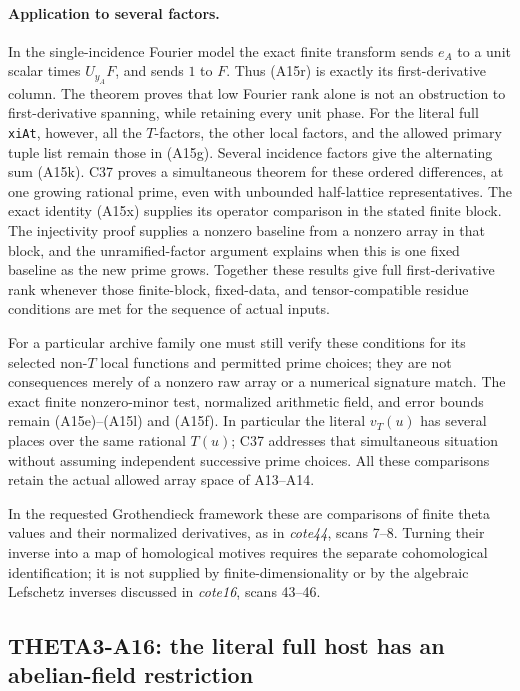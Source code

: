 \documentclass[11pt]{article}
\theoremstyle{definition}\newtheorem{definition}[theorem]{Definition}\newtheorem{remark}[theorem]{Remark}
\begin{document}
\paragraph{Application to several factors.}
In the single-incidence Fourier model the exact finite transform
sends $e_A$ to a unit scalar times $U_{y_A}F$, and sends $1$ to
$F$.  Thus (A15r) is exactly its first-derivative column.  The
theorem proves that low Fourier rank alone is not an obstruction
to first-derivative spanning, while retaining every unit phase.
For the literal full \texttt{xiAt}, however, all the $T$-factors,
the other local factors, and the allowed primary tuple list remain
those in (A15g).  Several incidence factors give the alternating
sum (A15k).  C37 proves a simultaneous theorem for these ordered
differences, at one growing rational prime, even with unbounded
half-lattice representatives.  The exact identity (A15x) supplies
its operator comparison in the stated finite block.  The
injectivity proof supplies a nonzero baseline from a nonzero
array in that block, and the unramified-factor argument explains
when this is one fixed baseline as the new prime grows.
Together these results give full first-derivative rank whenever
those finite-block, fixed-data, and tensor-compatible residue
conditions are met for the sequence of actual inputs.

For a particular archive family one must still verify these
conditions for its selected non-$T$ local functions and permitted
prime choices; they are not consequences merely of a nonzero raw
array or a numerical signature match.  The exact finite
nonzero-minor test, normalized arithmetic field, and error bounds
remain (A15e)--(A15l) and (A15f).  In particular the literal
$v_T(u)$ has several places over the same rational $T(u)$;
C37 addresses that simultaneous situation without assuming
independent successive prime choices.  All these comparisons
retain the actual allowed array space of A13--A14.

In the requested Grothendieck framework these are comparisons of
finite theta values and their normalized derivatives, as in
\emph{cote44}, scans 7--8.  Turning their inverse into a map of
homological motives requires the separate cohomological
identification; it is not supplied by finite-dimensionality or by
the algebraic Lefschetz inverses discussed in \emph{cote16},
scans 43--46.


\subsection{THETA3-A16: the literal full host has an abelian-field restriction}\label{A16}
\end{document}
